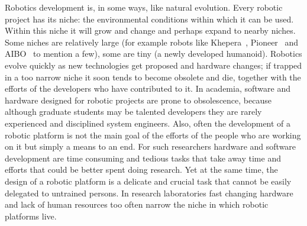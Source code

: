 Robotics development is, in some ways, like natural 
evolution. Every robotic project has its niche:
the environmental conditions within which it can be
used.  Within this niche it will grow and change and 
perhaps expand to nearby niches.
Some niches are relatively large (for example robots like 
Khepera~\cite{kephera}, 
Pioneer~\cite{pioneer} and 
AIBO~\cite{aibo} to mention a few), some are tiny (a newly 
developed humanoid). 
Robotics evolve quickly as new technologies get proposed 
and hardware changes; if trapped 
in a too narrow niche it soon tends to become obsolete and die, 
together with the efforts of the developers who have contributed 
to it. In academia, software and hardware designed for robotic 
projects are prone to obsolescence, 
because although graduate students may be 
talented developers they are rarely
experienced and disciplined system engineers.
Also, often the development of a robotic platform is not the main goal 
of the efforts of the people who are working on it but
simply a means to an end.
For such researchers hardware and software development are time 
consuming and tedious tasks that take away time and efforts that 
could be better spent doing research. Yet at the same time, the 
design of a robotic platform is a delicate and crucial task that 
cannot be easily delegated to untrained persons. In research 
laboratories fast changing hardware and lack of human resources 
too often narrow the niche in which robotic platforms live.


